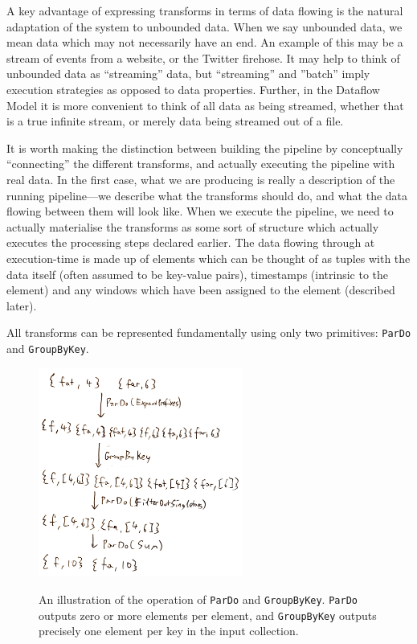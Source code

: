 A key advantage of expressing transforms in terms of data flowing is the natural adaptation of the system to unbounded data.
When we say unbounded data, we mean data which may not necessarily have an end.
An example of this may be a stream of events from a website, or the Twitter firehose.
It may help to think of unbounded data as ``streaming'' data, but ``streaming'' and ''batch'' imply execution strategies as opposed to data properties.
Further, in the Dataflow Model it is more convenient to think of all data as being streamed, whether that is a true infinite stream, or merely data being streamed out of a file.

It is worth making the distinction between building the pipeline by conceptually ``connecting'' the different transforms, and actually executing the pipeline with real data.
In the first case, what we are producing is really a description of the running pipeline---we describe what the transforms should do, and what the data flowing between them will look like.
When we execute the pipeline, we need to actually materialise the transforms as some sort of structure which actually executes the processing steps declared earlier.
The data flowing through at execution-time is made up of elements which can be thought of as tuples with the data itself (often assumed to be key-value pairs), timestamps (intrinsic to the element) and any windows which have been assigned to the element (described later).

All transforms can be represented fundamentally using only two primitives: \verb|ParDo| and \verb|GroupByKey|\footnotemark[2].


\begin{figure}[h]
	\centering
	\includegraphics[width=0.6\textwidth]{images/temp/pardo-gbk}
	\label{fig:prep:pardo-gbk}
	\caption{An illustration of the operation of \texttt{ParDo} and \texttt{GroupByKey}. \texttt{ParDo} outputs zero or more elements per element, and \texttt{GroupByKey} outputs precisely one element per key in the input collection.}
\end{figure}


